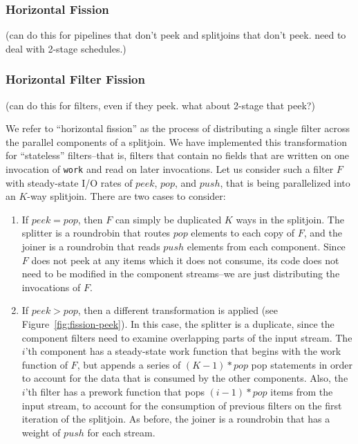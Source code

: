 \subsubsection{Horizontal Fission}

(can do this for pipelines that don't peek and splitjoins that don't
peek.  need to deal with 2-stage schedules.)

\subsubsection{Horizontal Filter Fission}

(can do this for filters, even if they peek.  what about 2-stage that
peek?)

We refer to ``horizontal fission'' as the process of distributing a
single filter across the parallel components of a splitjoin.  We have
implemented this transformation for ``stateless'' filters--that is,
filters that contain no fields that are written on one invocation of
{\tt work} and read on later invocations.  Let us consider such a
filter $F$ with steady-state I/O rates of $peek$, $pop$, and $push$,
that is being parallelized into an $K$-way splitjoin.  There are two
cases to consider:
\begin{enumerate}
\item If {\bf $peek = pop$}, then $F$ can simply be duplicated $K$
ways in the splitjoin.  The splitter is a roundrobin that routes $pop$
elements to each copy of $F$, and the joiner is a roundrobin that
reads $push$ elements from each component.  Since $F$ does not peek at
any items which it does not consume, its code does not need to be
modified in the component streams--we are just distributing the
invocations of $F$.

\item If {\bf $peek > pop$}, then a different transformation is
applied (see Figure~\ref{fig:fission-peek}).  In this case, the
splitter is a duplicate, since the component filters need to examine
overlapping parts of the input stream.  The $i$'th component has a
steady-state work function that begins with the work function of $F$,
but appends a series of $(K-1)*pop$ pop statements in order to account
for the data that is consumed by the other components.  Also, the
$i$'th filter has a prework function that pops $(i-1)*pop$ items from
the input stream, to account for the consumption of previous filters
on the first iteration of the splitjoin.  As before, the joiner is a
roundrobin that has a weight of $push$ for each stream.
\end{enumerate}

